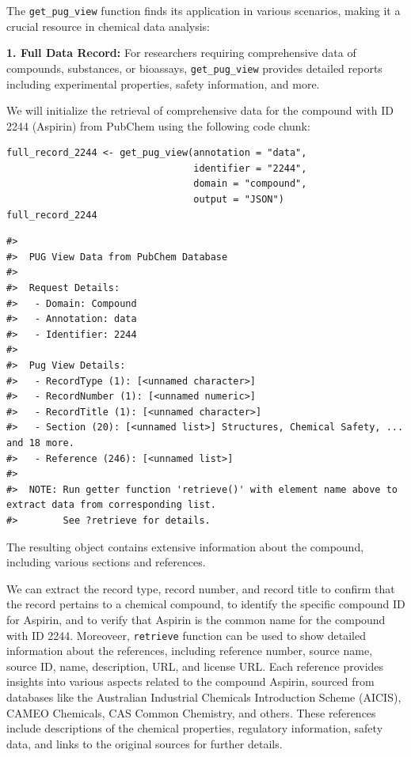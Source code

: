 The \texttt{get\_pug\_view} function finds its application in various scenarios, making it a crucial resource in chemical data analysis:

\textbf{1. Full Data Record:} For researchers requiring comprehensive data of compounds, substances, or bioassays, \texttt{get\_pug\_view} provides detailed reports including experimental properties, safety information, and more.

We will initialize the retrieval of comprehensive data for the compound with ID 2244 (Aspirin) from PubChem using the following code chunk:

\begin{verbatim}
full_record_2244 <- get_pug_view(annotation = "data", 
                                 identifier = "2244", 
                                 domain = "compound", 
                                 output = "JSON") 
full_record_2244
\end{verbatim}

\begin{verbatim}
#> 
#>  PUG View Data from PubChem Database 
#> 
#>  Request Details:  
#>   - Domain: Compound
#>   - Annotation: data
#>   - Identifier: 2244
#> 
#>  Pug View Details: 
#>   - RecordType (1): [<unnamed character>] 
#>   - RecordNumber (1): [<unnamed numeric>] 
#>   - RecordTitle (1): [<unnamed character>] 
#>   - Section (20): [<unnamed list>] Structures, Chemical Safety, ... and 18 more.
#>   - Reference (246): [<unnamed list>] 
#> 
#>  NOTE: Run getter function 'retrieve()' with element name above to extract data from corresponding list. 
#>        See ?retrieve for details.
\end{verbatim}

The resulting object contains extensive information about the compound, including various sections and references.

We can extract the record type, record number, and record title to confirm that the record pertains to a chemical compound, to identify the specific compound ID for Aspirin, and to verify that Aspirin is the common name for the compound with ID 2244. Moreoveer, \texttt{retrieve} function can be used to show detailed information about the references, including reference number, source name, source ID, name, description, URL, and license URL. Each reference provides insights into various aspects related to the compound Aspirin, sourced from databases like the Australian Industrial Chemicals Introduction Scheme (AICIS), CAMEO Chemicals, CAS Common Chemistry, and others. These references include descriptions of the chemical properties, regulatory information, safety data, and links to the original sources for further details.

